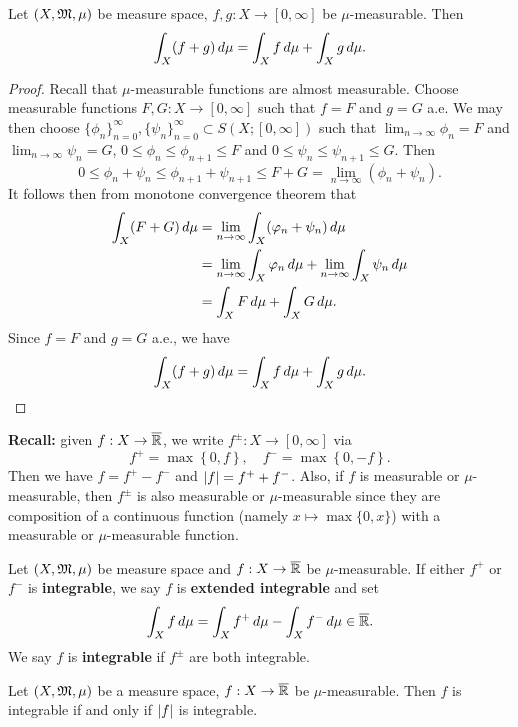 \documentclass[a4paper]{article}
\renewcommand{\seqinfn}[1]{\{ #1 \}_{n=0}^\infty}
\begin{document}
\begin{thm}
Let $(X, \mathfrak{M}, \mu)$ be measure space, $f, g : X \to [0, \infty]$
be $\mu$-measurable. Then
\[
\int_X (f + g) \, d \mu = \int_X f \, d \mu + \int_X g \, d \mu.
\]
\end{thm}

\begin{proof}
Recall that $\mu$-measurable functions are almost
measurable. Choose measurable functions
$F, G : X \to [0, \infty]$ such that $f = F$
and $g = G$ a.e. We may then choose
$\seqinfn{\phi_n}, \seqinfn{\psi_n} \subset S(X; [0, \infty])$
such that $\lim_{n \to \infty} \phi_n = F$
and $\lim_{n \to \infty} \psi_n = G$,
$0 \leq \phi_n \leq \phi_{n+1} \leq F$
and $0 \leq \psi_n \leq \psi_{n+1} \leq G$.
Then
\[
0 \leq \phi_n + \psi_n \leq \phi_{n+1} + \psi_{n+1}
\leq F + G = \lim_{n \to \infty} (\phi_n + \psi_n).
\]
It follows then from monotone convergence theorem that
\[
\begin{aligned}
\int_X (F + G) \, d \mu
&= \lim_{n \to \infty} \int_X (\varphi_n + \psi_n) \, d \mu \\
&= \lim_{n \to \infty} \int_X \varphi_n \, d \mu
+ \lim_{n \to \infty} \int_X \psi_n \, d \mu \\
&= \int_X F \, d \mu + \int_X G \, d \mu.
\end{aligned}
\]
Since $f = F$ and $g = G$ a.e., we have
\[
\int_X (f + g) \, d \mu = \int_X f \, d \mu + \int_X g \, d \mu.
\]
\end{proof}

\textbf{Recall:} given $f: X \to \overline{\mathbb{R}}$,
we write $f^{\pm} : X \to [0, \infty]$ via
\[
f^+ = \max\left\{ 0, f \right\}, \quad
f^- = \max\left\{ 0, -f \right\}.
\]
Then we have $f = f^+ - f^-$ and
$\left\lvert f\right\rvert = f^+ + f^-$. Also, if $f$ is measurable or
$\mu$-measurable, then $f^\pm$ is also measurable or
$\mu$-measurable since they are composition of a
continuous function (namely $x \mapsto \max \{0, x\}$)
with a measurable or $\mu$-measurable
function.

\begin{defi}
Let $(X, \mathfrak{M}, \mu)$ be measure space and
$f : X \to \overline{\mathbb{R}}$ be $\mu$-measurable.
If either $f^+$ or $f^-$ is \textbf{integrable},
we say $f$ is \textbf{extended integrable} and
set
\[
\int_X f \, d \mu = \int_X f^+ \, d \mu - \int_X f^- \, d \mu
\in \overline{\mathbb{R}}.
\]
We say $f$ is \textbf{integrable} if $f^\pm$ are both
integrable.
\end{defi}

\begin{prop}
Let $(X, \mathfrak{M}, \mu)$ be a measure space, $f : X \to \overline{\mathbb{R}}$
be $\mu$-measurable. Then $f$ is integrable
if and only if $\left\lvert f\right\rvert$ is integrable.
\end{prop}
\end{document}
